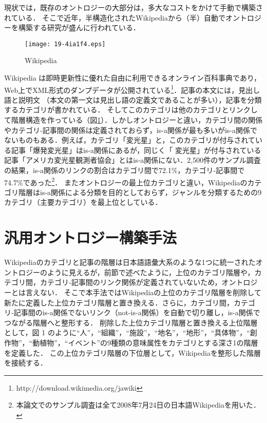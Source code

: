 \documentclass[japanese]{jnlp_1.4}
\begin{document}
現状では，既存のオントロジーの大部分は，多大なコストをかけて手動で構築されている\cite{Morita}．
そこで近年，半構造化されたWikipediaから（半）自動でオントロジーを構築する研究が盛んに行われている．

\begin{figure}[b]
\begin{center}
\texttt{[image: 19-4ia1f4.eps]}
\end{center}
\caption{Wikipedia}
\label{fig:wiki_kaisou}
\end{figure}

Wikipedia は即時更新性に優れた自由に利用できるオンライン百科事典であり，
Web上でXML形式のダンプデータが公開されている\footnote{http://download.wikimedia.org/jawiki}．記事の本文には，見出し語と説明文
（本文の第一文は見出し語の定義文であることが多い），記事を分類するカテゴリが書かれている．
そしてこのカテゴリは他のカテゴリとリンクして階層構造を作っている（図\ref{fig:wiki_kaisou}）．しかしオントロジーと違い，カテゴリ間の関係やカテゴリ‐記事間の関係は定義されておらず，is-a関係が最も多いがis-a関係でないものもある．例えば，カテゴリ「変光星」と，このカテゴリが付与されている記事「爆発変光星」はis-a関係にあるが，同じく「
変光星」が付与されている記事「アメリカ変光星観測者協会」とはis-a関係にない．2,500件のサンプル調査の結果，is-a関係のリンクの割合はカテゴリ間で72.1\%，カテゴリ‐記事間で74.7\%であった\footnote{本論文でのサンプル調査は全て2008年7月24日の日本語Wikipediaを用いた．}．
またオントロジーの最上位カテゴリと違い，Wikipediaのカテゴリ階層はis-a関係による分類を目的としておらず，ジャンルを分類するための9カテゴリ（主要カテゴリ）を最上位としている．


\section{汎用オントロジー構築手法}\label{sec:syuhou}

Wikipediaのカテゴリと記事の階層は日本語語彙大系のような1つに統一されたオントロジーのように見えるが，前節で述べたように，上位のカテゴリ階層や，カテゴリ間，カテゴリ‐記事間のリンク関係が定義されていないため，オントロジーとは言えない．
そこで本手法ではWikipediaの上位のカテゴリ階層を削除して新たに定義した上位カテゴリ階層と置き換える．さらに，カテゴリ間，カテゴリ‐記事間のis-a関係でないリンク（not-is-a関係）を自動で切り離し，is-a関係でつながる階層へと整形する．
削除した上位カテゴリ階層と置き換える上位階層として，図 1 のように``人''，``組織''，``施設''，``地名''，``地形''，``具体物''，``創作物''，``動植物''，``イベント''の9種類の意味属性をカテゴリとする深さ1の階層を定義した．
この上位カテゴリ階層の下位層として，Wikipediaを整形した階層を接続する．
\end{document}
